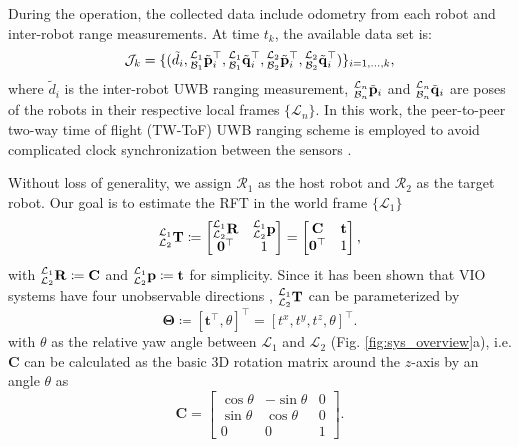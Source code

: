 \documentclass[journal]{IEEEtran}
\def\Robot{\mathcal{R}}
\def\StateVector{\mathbf{\Theta}}
\begin{document}
During the operation, the collected data include odometry from each robot and inter-robot range measurements. At time $t_k$, the available data set is:
\begin{equation}
    \mathcal{J}_k = \{(
        \tilde{d}_i,
        \prescript{\mathcal{L}_1}{\mathcal{B}_1}{\tilde{\mathbf{p}}}_i^\top,
        \prescript{\mathcal{L}_1}{\mathcal{B}_1}{\tilde{\mathbf{q}}}_i^\top,
        \prescript{\mathcal{L}_2}{\mathcal{B}_2}{\tilde{\mathbf{p}}}_i^\top,
        \prescript{\mathcal{L}_2}{\mathcal{B}_2}{\tilde{\mathbf{q}}}_i^\top
    )\}_{i=1,...,k},
\end{equation}
where $\tilde{d}_i$ is the inter-robot UWB ranging measurement, $\prescript{\mathcal{L}_n}{\mathcal{B}_n}{\tilde{\mathbf{p}}}_i$ and $\prescript{\mathcal{L}_n}{\mathcal{B}_n}{\tilde{\mathbf{q}}}_i$ are poses of the robots in their respective local frames $\{\mathcal{L}_n\}$. 
In this work, the peer-to-peer two-way time of flight (TW-ToF) UWB ranging scheme is employed to avoid complicated clock synchronization between the sensors \cite{nguyen2020ranging}.

Without loss of generality, we assign $\Robot_1$ as the host robot and $\Robot_2$ as the target robot. Our goal is to estimate the RFT in the world frame $\{\mathcal{L}_1\}$
\begin{equation}
    \prescript{\mathcal{L}_1}{\mathcal{L}_2}{\mathbf{T}} \coloneqq
    \begin{bmatrix}
        \prescript{\mathcal{L}_1}{\mathcal{L}_2}{\mathbf{R}}& \prescript{\mathcal{L}_1}{\mathcal{L}_2}{\mathbf{p}}\\
        \mathbf{0}^\top & 1
    \end{bmatrix}
    =   
    \begin{bmatrix}
        \mathbf{C} & \mathbf{t}\\
        \mathbf{0}^\top & 1
    \end{bmatrix},
\end{equation}
with $\prescript{\mathcal{L}_1}{\mathcal{L}_2}{\mathbf{R}} \coloneqq \mathbf{C}$ and $\prescript{\mathcal{L}_1}{\mathcal{L}_2}{\mathbf{p}} \coloneqq \mathbf{t}$ for simplicity. Since it has been shown that VIO systems have four unobservable directions \cite{huang2019visual}, $\prescript{\mathcal{L}_1}{\mathcal{L}_2}{\mathbf{T}}$ can be parameterized by
\begin{equation}
    \StateVector \coloneqq [\mathbf{t}^\top, \theta]^\top = [t^x, t^y, t^z, \theta]^\top.
\end{equation}
with $\theta$ as the relative yaw angle between $\mathcal{L}_1$ and $\mathcal{L}_2$ (Fig. \ref{fig:sys_overview}a), i.e. $\mathbf{C}$ can be calculated as the basic 3D rotation matrix around the $z$-axis by an angle $\theta$ as
\begin{equation}
    \mathbf{C} =
    \begin{bmatrix}
        \cos \theta & -\sin \theta  & 0\\
        \sin \theta &  \cos \theta  & 0\\
        0           &  0            & 1
    \end{bmatrix}.
\end{equation}
\end{document}
